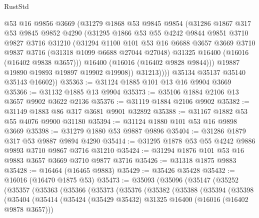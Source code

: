 \begin{lexlean}{RustStd}
\begin{coremodule}
                @53
                @16
                @9856
                @3669
                (@31279
                  @1868
                  @53
                  @9845
                  @9854
                  (@31286
                    @1867
                    @317
                    @53
                    @9845
                    @9852
                    @4290
                    (@31295
                      @1866
                      @53
                      @55
                      @4242
                      @9844
                      @9851
                      @3710
                      @9827
                      @3716
                      @31210
                      (@31294
                        @1100
                        @101
                        @53
                        @16
                        @6688
                        @3657
                        @3669
                        @3710
                        @9837
                        @3716
                        (@31318 @1099 @6688 @27044 @27048)
                        @31325
                        @16400
                        (@16016 (@16402 @9838 @3657)))
                      @16400
                      (@16016 (@16402 @9828 @9844)))
                    @19887
                    @19890
                    @19893
                    @19897
                    @19902
                    @19908))
                @31213))))
        @35134
        @35137
        @35140
        @35143
        @16602))
@35363 := @31124 @1885 @101 @13 @16 @9904 @3669
@35366 := @31132 @1885 @13 @9904
@35373 := @35106 @1884 @2106 @13 @3657 @9902 @3622 @2136
@35376 := @31119 @1884 @2106 @9902
@35382 := @31149 @1883 @86 @317 @3681 @9901 @32892
@35388 := @31167 @1882 @53 @55 @4076 @9900 @31180
@35394 := @31124 @1880 @101 @53 @16 @9898 @3669
@35398 := @31279 @1880 @53 @9887 @9896
@35404 := @31286 @1879 @317 @53 @9887 @9894 @4290
@35414 := @31295 @1878 @53 @55 @4242 @9886 @9893 @3710 @9867 @3716 @31210
@35424 := @31294 @1876 @101 @53 @16 @9883 @3657 @3669 @3710 @9877 @3716
@35426 := @31318 @1875 @9883
@35428 := @16464 (@16465 @9883)
@35429 := @35426 @35428
@35432 := @16016 (@16470 @1875 @53)
@35473 := @35093
    (@35096
      (@35147
        (@35252
          (@35357
            (@35363
              (@35366
                (@35373
                  (@35376
                    (@35382
                      (@35388
                        (@35394
                          (@35398
                            (@35404
                              (@35414
                                (@35424 (@35429 @35432) @31325 @16400 (@16016 (@16402 @9878 @3657)))

\end{coremodule}
\end{lexlean}
